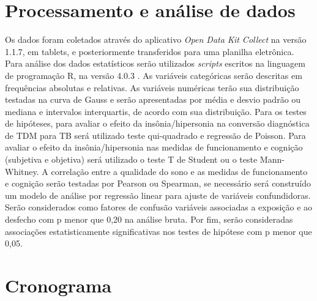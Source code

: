 \documentclass[chapter=TITLE,
               oneside,
               12pt,
               a4paper,
               english,
               brazil]{abntex2}    %
\begin{document}
\section{Processamento e análise de dados}\label{sec:analise}

    Os dados foram coletados através do aplicativo \textit{Open Data Kit Collect}
    na versão 1.1.7, em tablets, e posteriormente transferidos para uma planilha
    eletrônica. Para análise dos dados estatísticos serão utilizados
    \textit{scripts} escritos na linguagem de programação R, na versão 4.0.3
    \parencite{r_language}.
    As variáveis categóricas serão descritas em frequências absolutas e relativas.
    As variáveis numéricas terão sua distribuição testadas na curva de Gauss e serão
    apresentadas por média e desvio padrão ou mediana e intervalos interquartis,
    de acordo com sua distribuição.
    Para os testes de hipóteses, para avaliar o efeito da insônia/hipersonia na
    conversão diagnóstica de TDM para TB será utilizado teste qui-quadrado e
    regressão de Poisson. Para avaliar o efeito da insônia/hipersonia nas medidas
    de funcionamento e cognição (subjetiva e objetiva) será utilizado o teste T
    de Student ou o teste Mann-Whitney.
    A correlação entre a qualidade do sono e as medidas de funcionamento e cognição
    serão testadas por Pearson ou Spearman, se necessário será construído um modelo
    de análise por regressão linear para ajuste de variáveis confundidoras.
    Serão considerados como fatores de confusão variáveis associadas a exposição
    e ao desfecho com p menor que 0,20 na análise bruta. Por fim, serão consideradas
    associações estatisticamente significativas nos testes de hipótese com p
    menor que 0,05.

\section{Cronograma}\label{sec:cronograma}
\end{document}
